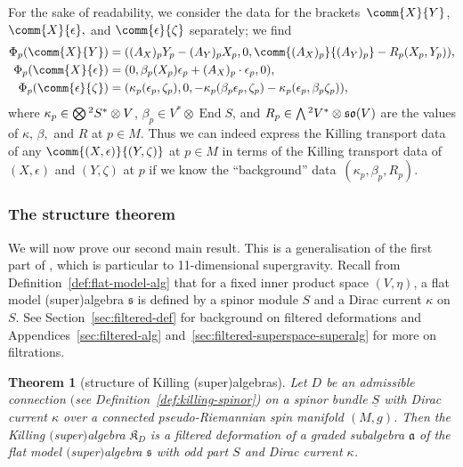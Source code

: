 \documentclass[pdftex]{sigma}
\numberwithin{equation}{section}
\newtheorem{Theorem}{Theorem}[section]
\newcommand{\fa}{\mathfrak{a}}
\newcommand{\fs}{\mathfrak{s}}
\newcommand{\fso}{\mathfrak{so}}
\newcommand{\fK}{\mathfrak{K}}
\newcommand{\Sbundle}{\underline{S}}
\newcommand{\Wedge}{\mathchoice{{\textstyle\bigwedge}}{\bigwedge}{\bigwedge}{\bigwedge}}	%
\newcommand{\Otimes}{\mathchoice{{\textstyle\bigotimes}}{\bigotimes}{\bigotimes}{\bigotimes}}
\newcommand{\1}{\mathbbm{1}}
\DeclareMathOperator{\End}{End}
\begin{document}
For the sake of readability, we consider the data for the brackets~$\comm{X}{Y}$, $\comm{X}{\epsilon},$ and $\comm{\epsilon}{\zeta}$ separately; we find
\begin{align}
	\Phi_p(\comm{X}{Y})
		&= ((A_X)_p Y_p - (A_Y)_p X_p,0,\comm{(A_X)_p}{(A_Y)_p} - R_p(X_p,Y_p)),
		\label{eq:phi-p-XY}\\
	\Phi_p(\comm{X}{\epsilon})
		&= (0,\beta_p(X_p)\epsilon_p + (A_X)_p\cdot\epsilon_p,0),
		\label{eq:phi-p-Xepsilon}\\
	\Phi_p(\comm{\epsilon}{\zeta})
		&= (\kappa_p(\epsilon_p,\zeta_p),0,- \kappa_p(\beta_p\epsilon_p,\zeta_p) - \kappa_p(\epsilon_p,\beta_p\zeta_p)),
		\label{eq:phi-p-epsilonzeta}
\end{align}
where $\kappa_p\in\Otimes^2S^*\otimes V$, $\beta_p\in V^*\otimes\End S$, and $R_p\in\Wedge^2V^*\otimes \fso(V)$ are the values of $\kappa$, $\beta,$ and $R$ at $p\in M$. Thus we can indeed express the Killing transport data of any $\comm{(X,\epsilon)}{(Y,\zeta)}$ at $p\in M$ in terms of the Killing transport data of $(X,\epsilon)$ and $(Y,\zeta)$ at $p$ if we know the ``background'' data~$(\kappa_p,\beta_p,R_p)$.

\subsubsection{The structure theorem}

We will now prove our second main result. This is a generalisation of the first part of \cite[Theorem~12]{Figueroa-OFarrill2017_1}, which is particular to 11-dimensional supergravity. Recall from Definition~\ref{def:flat-model-alg} that for a fixed inner product space $(V,\eta)$, a flat model (super)algebra $\fs$ is defined by a spinor module $S$ and a Dirac current $\kappa$ on $S$. See Section~\ref{sec:filtered-def} for background on filtered deformations and Appendices~\ref{sec:filtered-alg} and~\ref{sec:filtered-superspace-superalg} for more on filtrations.

\begin{Theorem}[structure of Killing (super)algebras]\label{thm:killing-algebra-filtered}
	Let $D$ be an admissible connection $($see Definition~{\rm\ref{def:killing-spinor})} on a spinor bundle $\Sbundle$ with Dirac current $\kappa$ over a connected pseudo-Riemannian spin manifold $(M,g)$. Then the Killing $($super$)$algebra $\fK_D$ is a filtered deformation of a graded subalgebra $\fa$ of the flat model $($super$)$algebra $\fs$ with odd part $S$ and Dirac current $\kappa$.
\end{Theorem}
\end{document}
